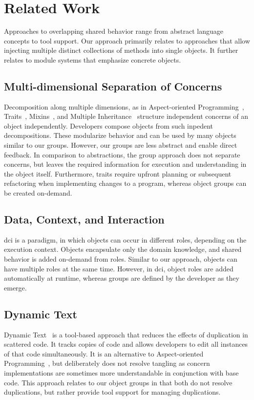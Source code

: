 \section{Related Work} \label{sec:RELATED_WORK}

Approaches to overlapping shared behavior range from abstract language concepts to tool support. Our approach primarily relates to approaches that allow injecting multiple distinct collections of methods into single objects. It further relates to module systems that emphasize concrete objects.

\subsection{Multi-dimensional Separation of Concerns}

Decomposition along multiple dimensions, as in Aspect-oriented Programming~\cite{Kiczales1997AOP}, Traits~\cite{Curry1982TAM}, Mixins~\cite{Curry1982TAM}, and Multiple Inheritance~\cite{cardelli1984semantics} structure independent concerns of an object independently. Developers compose objects from such inpedent decompositions. These modularize behavior and can be used by many objects similar to our groups. However, our groups are less abstract and enable direct feedback. In comparison to abstractions, the group approach does not separate concerns, but leaves the required information for execution and understanding in the object itself. Furthermore, traits require upfront planning or subsequent refactoring when implementing changes to a program, whereas object groups can be created on-demand.

\subsection{Data, Context, and Interaction}
\ac{dci} is a paradigm, in which objects can occur in different roles, depending on the execution context. Objects encapsulate only the domain knowledge, and shared behavior is added on-demand from roles. Similar to our approach, objects can have multiple roles at the same time. However, in \ac{dci}, object roles are added automatically at runtime, whereas groups are defined by the developer as they emerge.

\subsection{Dynamic Text}
Dynamic Text~\cite{Chiba2012WRN} is a tool-based approach that reduces the effects of duplication in scattered code. It tracks copies of code and allows  developers to edit all instances of that code simultaneously. It is an alternative to Aspect-oriented Programming~\cite{Kiczales1997AOP}, but deliberately does not resolve tangling as concern implementations
are sometimes more understandable in conjunction with base code.
This approach relates to our object groups in that both do not resolve duplications, but rather provide tool support for managing duplications.

